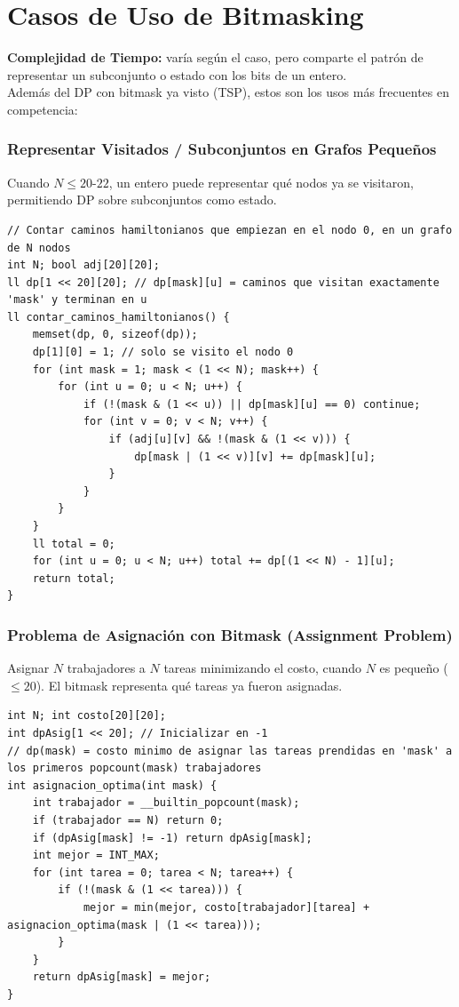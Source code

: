 \documentclass[10pt,twocolumn,letterpaper]{report}
\begin{document}
\section{Casos de Uso de Bitmasking}
\textbf{Complejidad de Tiempo:} varía según el caso, pero comparte el patrón de representar un subconjunto o estado con los bits de un entero. \\
Además del DP con bitmask ya visto (TSP), estos son los usos más frecuentes en competencia:
\subsubsection{Representar Visitados / Subconjuntos en Grafos Pequeños}
Cuando $N \leq 20$-$22$, un entero puede representar qué nodos ya se visitaron, permitiendo DP sobre subconjuntos como estado.
\begin{lstlisting}
// Contar caminos hamiltonianos que empiezan en el nodo 0, en un grafo de N nodos
int N; bool adj[20][20];
ll dp[1 << 20][20]; // dp[mask][u] = caminos que visitan exactamente 'mask' y terminan en u
ll contar_caminos_hamiltonianos() {
    memset(dp, 0, sizeof(dp));
    dp[1][0] = 1; // solo se visito el nodo 0
    for (int mask = 1; mask < (1 << N); mask++) {
        for (int u = 0; u < N; u++) {
            if (!(mask & (1 << u)) || dp[mask][u] == 0) continue;
            for (int v = 0; v < N; v++) {
                if (adj[u][v] && !(mask & (1 << v))) {
                    dp[mask | (1 << v)][v] += dp[mask][u];
                }
            }
        }
    }
    ll total = 0;
    for (int u = 0; u < N; u++) total += dp[(1 << N) - 1][u];
    return total;
}
\end{lstlisting}
\subsubsection{Problema de Asignación con Bitmask (Assignment Problem)}
Asignar $N$ trabajadores a $N$ tareas minimizando el costo, cuando $N$ es pequeño ($\leq 20$). El bitmask representa qué tareas ya fueron asignadas.
\begin{lstlisting}
int N; int costo[20][20];
int dpAsig[1 << 20]; // Inicializar en -1
// dp(mask) = costo minimo de asignar las tareas prendidas en 'mask' a los primeros popcount(mask) trabajadores
int asignacion_optima(int mask) {
    int trabajador = __builtin_popcount(mask);
    if (trabajador == N) return 0;
    if (dpAsig[mask] != -1) return dpAsig[mask];
    int mejor = INT_MAX;
    for (int tarea = 0; tarea < N; tarea++) {
        if (!(mask & (1 << tarea))) {
            mejor = min(mejor, costo[trabajador][tarea] + asignacion_optima(mask | (1 << tarea)));
        }
    }
    return dpAsig[mask] = mejor;
}
\end{lstlisting}
\end{document}
